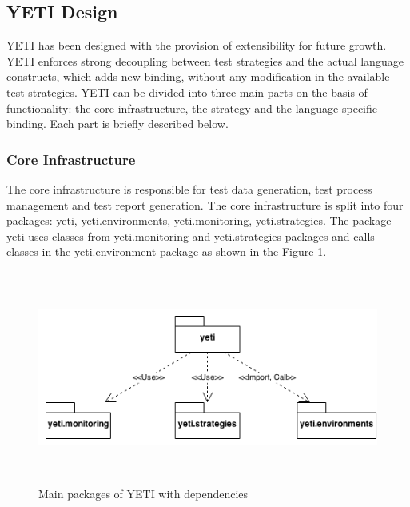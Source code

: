 \subsection{YETI Design}
YETI has been designed with the provision of extensibility for future growth. YETI enforces strong decoupling between test strategies and the actual language constructs, which adds new binding, without any modification in the available test strategies. YETI can be divided into three main parts on the basis of functionality: the core infrastructure, the strategy and the language-specific binding. Each part is briefly described below. 

\subsubsection{Core Infrastructure}
The core infrastructure is responsible for test data generation, test process management and test report generation. The core infrastructure is split into four packages: yeti, yeti.environments, yeti.monitoring, yeti.strategies. The package yeti uses classes from yeti.monitoring and yeti.strategies packages and calls classes in the yeti.environment package as shown in the Figure \ref{fig:yetiCore}. 

\begin{figure}[h]
	\centering
	\includegraphics[width=15cm, height=7cm]{chapter3/yetiCore.png}
	\caption{Main packages of YETI with dependencies }
	\label{fig:yetiCore}
\end{figure}

